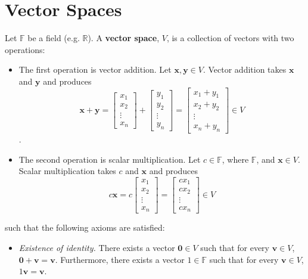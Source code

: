 \documentclass[12pt]{article}
\begin{document}
\section{Vector Spaces}
\begin{definition}
Let $\mathbb{F}$ be a field (e.g. $\mathbb{R}$). A \textbf{vector space}, $V$, is a collection of vectors with two operations:
\begin{itemize}
\item The first operation is vector addition. Let $\mathbf{x},\mathbf{y}\in V$. Vector addition takes $\mathbf{x}$ and $\mathbf{y}$ and produces $$\mathbf{x}+\mathbf{y} = \begin{bmatrix}x_1 \\ x_2 \\ \vdots \\ x_n\end{bmatrix}+\begin{bmatrix}y_1 \\ y_2 \\ \vdots \\ y_n\end{bmatrix} = \begin{bmatrix} x_1 + y_1 \\ x_2+y_2 \\ \vdots \\ x_n + y_n\end{bmatrix}\in V$$. 
\item The second operation is scalar multiplication. Let $c\in\mathbb{F}$, where $\mathbb{F}$, and $\mathbf{x}\in V$. Scalar multiplication takes $c$ and $\mathbf{x}$ and produces $$c\mathbf{x} = c\begin{bmatrix}x_1 \\ x_2 \\ \vdots \\ x_n\end{bmatrix} = \begin{bmatrix}cx_1 \\ cx_2 \\ \vdots \\ cx_n\end{bmatrix}\in V$$
\end{itemize}
such that the following axioms are satisfied:
\begin{itemize}
\item \textit{Existence of identity.} There exists a vector $\mathbf{0}\in V$ such that for every $\mathbf{v}\in V$, $\mathbf{0}+\mathbf{v} = \mathbf{v}$. Furthermore, there exists a vector $1\in \mathbb{F}$ such that for every $\mathbf{v}\in V$, $1\mathbf{v} = \mathbf{v}$.

\end{itemize}
\end{definition}
\end{document}
